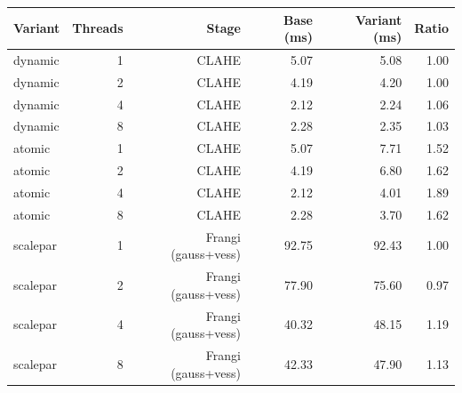 \begin{tabular}{lrrrrr}
\toprule
Variant & Threads & Stage & Base (ms) & Variant (ms) & Ratio \\
\midrule
dynamic & 1 & CLAHE & 5.07 & 5.08 & 1.00 \\
dynamic & 2 & CLAHE & 4.19 & 4.20 & 1.00 \\
dynamic & 4 & CLAHE & 2.12 & 2.24 & 1.06 \\
dynamic & 8 & CLAHE & 2.28 & 2.35 & 1.03 \\
atomic & 1 & CLAHE & 5.07 & 7.71 & 1.52 \\
atomic & 2 & CLAHE & 4.19 & 6.80 & 1.62 \\
atomic & 4 & CLAHE & 2.12 & 4.01 & 1.89 \\
atomic & 8 & CLAHE & 2.28 & 3.70 & 1.62 \\
scalepar & 1 & Frangi (gauss+vess) & 92.75 & 92.43 & 1.00 \\
scalepar & 2 & Frangi (gauss+vess) & 77.90 & 75.60 & 0.97 \\
scalepar & 4 & Frangi (gauss+vess) & 40.32 & 48.15 & 1.19 \\
scalepar & 8 & Frangi (gauss+vess) & 42.33 & 47.90 & 1.13 \\
\bottomrule
\end{tabular}
